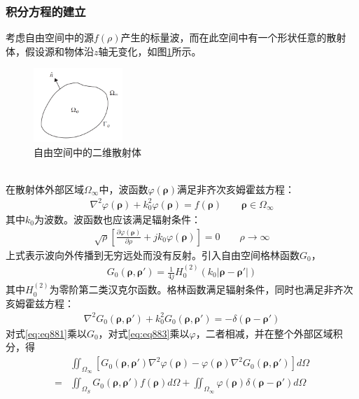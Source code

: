 \documentclass{article}
\numberwithin{equation}{section}
\renewcommand{\vec}[1]{\boldsymbol{#1}}
\begin{document}
\subsubsection{积分方程的建立}
考虑自由空间中的源$f(\rho)$产生的标量波，而在此空间中有一个形状任意的散射体，假设源和物体沿$z$轴无变化，如图\ref{fig:fig63}所示。
\begin{figure}[ht]
    \centering
    \includegraphics[width=0.3\textwidth]{自由空间中的二维散射体.PNG}
    \caption{自由空间中的二维散射体}
    \label{fig:fig63}
\end{figure}
\\
在散射体外部区域$\Omega_{\infty}$中，波函数$\varphi(\vec{\rho})$满足非齐次亥姆霍兹方程：
\begin{align}
    \label{eq:eq881}
    \nabla^2\varphi(\vec{\rho})+k^2_0\varphi(\vec{\rho})=f(\vec{\rho})\qquad\vec{\rho}\in\Omega_{\infty}
\end{align}
其中$k_0$为波数。波函数也应该满足辐射条件：
\begin{align}
    \label{eq:eq882}
    \sqrt{\rho}\left[\frac{\partial\varphi(\vec{\rho})}{\partial\rho}+jk_0\varphi(\vec{\rho})\right]=0\qquad\rho\to\infty
\end{align}
上式表示波向外传播到无穷远处而没有反射。引入自由空间格林函数$G_0$，
\begin{align}
    \label{eq:eq884}
    G_0(\vec{\rho},\vec{\rho}')=\frac{1}{4j}H_0^{(2)}(k_0|\vec{\rho}-\vec{\rho}'|)
\end{align}
其中$H_0^{(2)}$为零阶第二类汉克尔函数。格林函数满足辐射条件，同时也满足非齐次亥姆霍兹方程：
\begin{align}
    \label{eq:eq883}
    \nabla^2G_0(\vec{\rho},\vec{\rho}')+k^2_0G_0(\vec{\rho},\vec{\rho}')=-\delta(\vec{\rho}-\vec{\rho}')
\end{align}
对式\ref{eq:eq881}乘以$G_0$，对式\ref{eq:eq883}乘以$\varphi$，二者相减，并在整个外部区域积分，得
\begin{align}
    \label{eq:eq885}
     &\iint_{\Omega_{\infty}}\left[G_0(\vec{\rho},\vec{\rho}')\nabla^2\varphi(\vec{\rho})-\varphi(\vec{\rho})\nabla^2G_0(\vec{\rho},\vec{\rho}')\right]d\Omega \nonumber \\
    =&\iint_{\Omega_{S}}G_0(\vec{\rho},\vec{\rho}')f(\vec{\rho})d\Omega+\iint_{\Omega_{\infty}}\varphi(\vec{\rho})\delta(\vec{\rho}-\vec{\rho}')d\Omega
\end{align}
\end{document}
